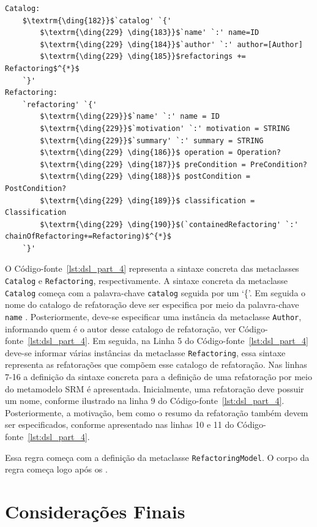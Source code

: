 \begin{lstlisting}[language=Xtext, frame=single, basicstyle=\scriptsize, mathescape=true, label={lst:dsl_part_4}, caption={Gramática da DSL - parte 4}]
Catalog:
	$\textrm{\ding{182}}$`catalog' `{' 
		$\textrm{\ding{229} \ding{183}}$`name' `:' name=ID
		$\textrm{\ding{229} \ding{184}}$`author' `:' author=[Author]
		$\textrm{\ding{229} \ding{185}}$refactorings += Refactoring$^{*}$
	`}'
Refactoring:
	`refactoring' `{' 
		$\textrm{\ding{229}}$`name' `:' name = ID
		$\textrm{\ding{229}}$`motivation' `:' motivation = STRING
		$\textrm{\ding{229}}$`summary' `:' summary = STRING
		$\textrm{\ding{229} \ding{186}}$ operation = Operation?
		$\textrm{\ding{229} \ding{187}}$ preCondition = PreCondition?
		$\textrm{\ding{229} \ding{188}}$ postCondition = PostCondition?
		$\textrm{\ding{229} \ding{189}}$ classification = Classification
		$\textrm{\ding{229} \ding{190}}$(`containedRefactoring' `:' chainOfRefactoring+=Refactoring)$^{*}$
	`}'
\end{lstlisting}

O Código-fonte~\ref{lst:dsl_part_4} representa a sintaxe concreta das metaclasses \texttt{Catalog} e \texttt{Refactoring}, respectivamente. A sintaxe concreta da metaclasse \texttt{Catalog} começa com a palavra-chave \texttt{catalog} seguida por um `\{'. Em seguida o nome do catalogo de refatoração deve ser especifica por meio da palavra-chave \texttt{name} . Posteriormente, deve-se especificar uma instância da metaclasse \texttt{Author}, informando quem é o autor desse catalogo de refatoração, ver Código-fonte~\ref{lst:dsl_part_4}. Em seguida, na Linha 5 do Código-fonte~\ref{lst:dsl_part_4} deve-se informar várias instâncias da metaclasse \texttt{Refactoring}, essa sintaxe representa as refatorações que compõem esse catalogo de refatoração. Nas linhas 7-16 a definição da sintaxe concreta para a definição de uma refatoração por meio do metamodelo SRM é apresentada. Inicialmente, uma refatoração deve possuir um nome, conforme ilustrado na linha 9 do Código-fonte~\ref{lst:dsl_part_4}. Posteriormente, a motivação, bem como o resumo da refatoração também devem ser especificados, conforme apresentado nas linhas 10 e 11 do Código-fonte~\ref{lst:dsl_part_4}.

Essa regra começa com a definição da metaclasse \texttt{RefactoringModel}. O corpo da regra começa logo após os \aspas{\texttt{:}}.


\section{Considerações Finais}
\label{sec:consideracoes_finais}


